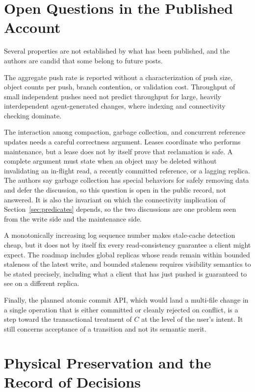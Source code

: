 \documentclass[11pt]{article}
\theoremstyle{definition}
\theoremstyle{plain}
\begin{document}
\section{Open Questions in the Published Account}\label{sec:open}

Several properties are not established by what has been published, and the authors are candid that some belong to future posts.

The aggregate push rate is reported without a characterization of push size, object counts per push, branch contention, or validation cost. Throughput of small independent pushes need not predict throughput for large, heavily interdependent agent-generated changes, where indexing and connectivity checking dominate.

The interaction among compaction, garbage collection, and concurrent reference updates needs a careful correctness argument. Leases coordinate who performs maintenance, but a lease does not by itself prove that reclamation is safe. A complete argument must state when an object may be deleted without invalidating an in-flight read, a recently committed reference, or a lagging replica. The authors say garbage collection has special behaviors for safely removing data and defer the discussion, so this question is open in the public record, not answered. It is also the invariant on which the connectivity implication of Section~\ref{sec:predicates} depends, so the two discussions are one problem seen from the write side and the maintenance side.

A monotonically increasing log sequence number makes stale-cache detection cheap, but it does not by itself fix every read-consistency guarantee a client might expect. The roadmap includes global replicas whose reads remain within bounded staleness of the latest write, and bounded staleness requires visibility semantics to be stated precisely, including what a client that has just pushed is guaranteed to see on a different replica.

Finally, the planned atomic commit API, which would land a multi-file change in a single operation that is either committed or cleanly rejected on conflict, is a step toward the transactional treatment of $C$ at the level of the user's intent. It still concerns acceptance of a transition and not its semantic merit.

\section{Physical Preservation and the Record of Decisions}
\end{document}
